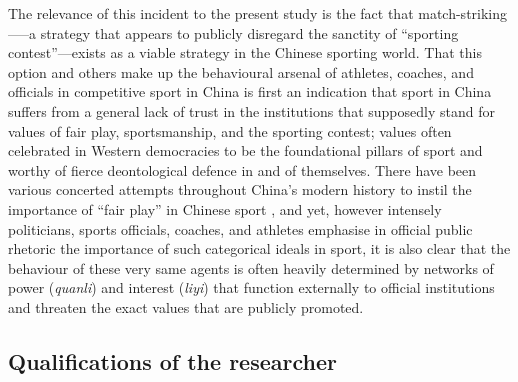  The relevance of this incident to the present study is the fact that match-striking—--a strategy that appears to publicly disregard the sanctity of ``sporting contest''---exists as a viable strategy in the Chinese sporting world. That this option and others make up the behavioural arsenal of athletes, coaches, and officials in competitive sport in China is first an indication that sport in China suffers from a general lack of trust in the institutions that supposedly stand for values of fair play, sportsmanship, and the sporting contest; values often celebrated in Western democracies to be the foundational pillars of sport and worthy of fierce deontological defence in and of themselves\citep{Morris2004,Gold2002,Yuki2005}.
  There have been various concerted attempts throughout China's modern history to instil the importance of ``fair play'' in Chinese sport \citep{Morris2004,Brownell1995,Brownell2008}, and yet, however intensely politicians, sports officials, coaches, and athletes emphasise in official public rhetoric the importance of such categorical ideals in sport, it is also clear that the behaviour of these very same agents is often heavily determined by networks of power (\textit{quanli}) and interest (\textit{liyi}) that function externally to official institutions and threaten the exact values that are publicly promoted.




  \subsection{Qualifications of the researcher}



